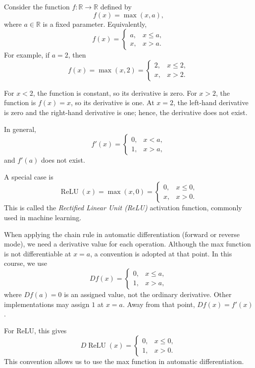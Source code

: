 Consider the function \(f:\mathbb{R}\to\mathbb{R}\) defined by
\[
	f(x)=\max(x,a),
\]
where \(a\in\mathbb{R}\) is a fixed parameter. Equivalently,
\[
	f(x)=
	\begin{cases}
		a, & x\leq a, \\
		x, & x>a.
	\end{cases}
\]
For example, if \(a=2\), then
\[
	f(x)=\max(x,2)=
	\begin{cases}
		2, & x\leq 2, \\
		x, & x>2.
	\end{cases}
\]

\begin{center}
\end{center}

For \(x<2\), the function is constant, so its derivative is zero. For \(x>2\), the function is \(f(x)=x\), so its derivative is one. At \(x=2\), the left-hand derivative is zero and the right-hand derivative is one; hence, the derivative does not exist.

In general,
\[
	f'(x)=
	\begin{cases}
		0, & x<a, \\
		1, & x>a,
	\end{cases}
\]
and \(f'(a)\) does not exist.

A special case is
\[
	\operatorname{ReLU}(x)=\max(x,0)
	=
	\begin{cases}
		0, & x\leq 0, \\
		x, & x>0.
	\end{cases}
\]
This is called the \emph{Rectified Linear Unit (ReLU)} activation function, commonly used in machine learning.

When applying the chain rule in automatic differentiation (forward or reverse mode), we need a derivative value for each operation. Although the max function is not differentiable at \(x=a\), a convention is adopted at that point. In this course, we use
\[
	Df(x)=
	\begin{cases}
		0, & x\leq a, \\
		1, & x>a,
	\end{cases}
\]
where \(Df(a)=0\) is an assigned value, not the ordinary derivative. Other implementations may assign \(1\) at \(x=a\). Away from that point, \(Df(x)=f'(x)\).

For ReLU, this gives
\[
	D\operatorname{ReLU}(x)=
	\begin{cases}
		0, & x\leq 0, \\
		1, & x>0.
	\end{cases}
\]
This convention allows us to use the max function in automatic differentiation.
